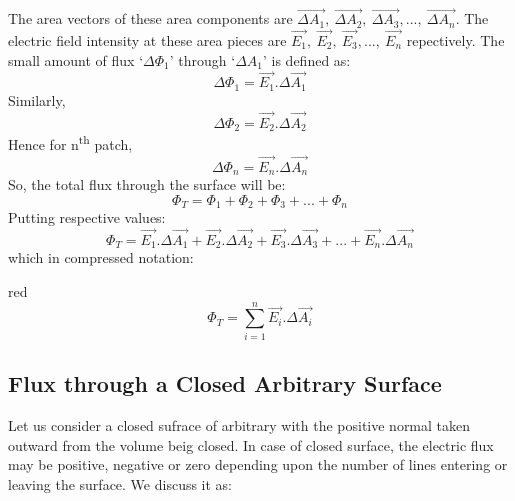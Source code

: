 The area vectors of these area components are $\vec{\Delta A_{1}},\:\vec{\Delta A_{2}},\:\vec{\Delta A_{3}},...,\:\vec{\Delta A_{n}}$.
The electric field intensity at these area pieces are $\vec{E_{1}},\:\vec{E_{2}},\:\vec{E_{3}},...,\:\vec{E_{n}}$ repectively.
The small amount of flux `$\Delta \Phi_{1}$' through `$\Delta A_{1}$' is defined as:
\begin{equation}
  \Delta \Phi_{1} = \vec{E_{1}}.\Delta \vec{A_{1}} \nonumber
\end{equation}
Similarly,
\begin{equation}
  \Delta \Phi_{2} = \vec{E_{2}}.\Delta \vec{A_{2}} \nonumber
\end{equation}
Hence for n\textsuperscript{th} patch, 
\begin{equation}
  \Delta \Phi_{n} = \vec{E_{n}}.\Delta \vec{A_{n}} \nonumber
\end{equation}
So, the total flux through the surface will be:
\begin{equation}
  \Phi_{T} =  \Phi_{1}+ \Phi_{2}+ \Phi_{3}+...+ \Phi_{n} \nonumber
\end{equation}
Putting respective values:
\begin{equation}
  \Phi_{T} = \vec{E_{1}}.\Delta \vec{A_{1}}+\vec{E_{2}}.\Delta \vec{A_{2}} +\vec{E_{3}}.\Delta \vec{A_{3}}+...+\vec{E_{n}}.\Delta \vec{A_{n}} \nonumber
\end{equation}
which in compressed notation:
\begin{mybox}{red}{}
\begin{equation} \label{eq:11.19}
  \Phi_{T} = \sum_{i=1}^{n} \vec{E_{i}}.\Delta \vec{A_{i}} 
\end{equation}
\end{mybox}
\subsection{Flux through a Closed Arbitrary Surface}
Let us consider a closed sufrace of arbitrary with the positive normal
taken outward from the volume beig closed. In case of closed surface,
the electric flux may be positive, negative or zero depending upon
the number of lines entering or leaving the surface. We discuss it as:

